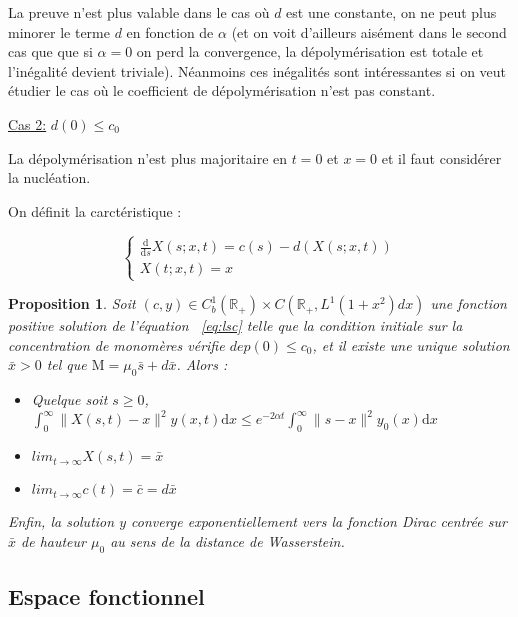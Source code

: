 \documentclass[a4paper]{article}
\newtheorem{prop}{Proposition}[section]
\theoremstyle{definition}
\theoremstyle{remark}
\newcommand{\mass}{\mathrm{M}}
\newcommand{\dep}{d}
\begin{document}
La preuve n'est plus valable dans le cas où $\dep$ est une constante, on ne peut plus minorer le terme $\dep$ en fonction de $\alpha$ (et on voit d'ailleurs aisément dans le second cas que que si $\alpha =0 $ on perd la convergence, la dépolymérisation est totale et l'inégalité devient triviale). Néanmoins ces inégalités sont intéressantes si on veut étudier le cas où le coefficient de dépolymérisation n'est pas constant.

\vspace{0.5cm}

\underline{Cas 2:} $\dep(0) \leq c_0 $

La dépolymérisation n'est plus majoritaire en $t=0$ et $x=0$ et il faut considérer la nucléation.

On définit la carctéristique :

\[
\begin{cases}
\displaystyle \frac{\mathrm{d}}{\mathrm{d}s} X(s;x,t)= c(s) - \dep(X(s;x,t))\\
X(t;x,t) = x
\end{cases}
\]

\begin{prop} 
Soit $(c,y) \in C_b^1(\mathbb{R}_+)\times C(\mathbb{R}_+,L^1(1+x^2)dx)$  une fonction positive solution de l'équation ~\eqref{eq:lsc} telle que la condition initiale sur la concentration de monomères vérifie $dep(0) \leq c_0$, et il existe une unique solution $\bar{x}>0$ tel que $\mass = \mu_0 \bar{s} +\dep{\bar{x}}$.
Alors :
\begin{itemize}
\item Quelque soit $s \geq 0$, $\int_0^\infty \|X(s,t) -x\|^2 y(x,t)\mathrm{d}x \leq e^{-2\alpha t}\int_0^\infty \|s -x\|^2y_0(x)\mathrm{d}x$
\item $lim_{t \rightarrow \infty}X(s,t) = \bar{x}$
\item $lim_{t \rightarrow \infty}c(t) = \bar{c} = \dep{\bar{x}}$
\end{itemize}

Enfin, la solution $y$ converge exponentiellement vers la fonction Dirac centrée sur $\bar{x}$ de hauteur $\mu_0$ au sens de la distance de Wasserstein.
\end{prop}





\subsection{Espace fonctionnel}
\end{document}
